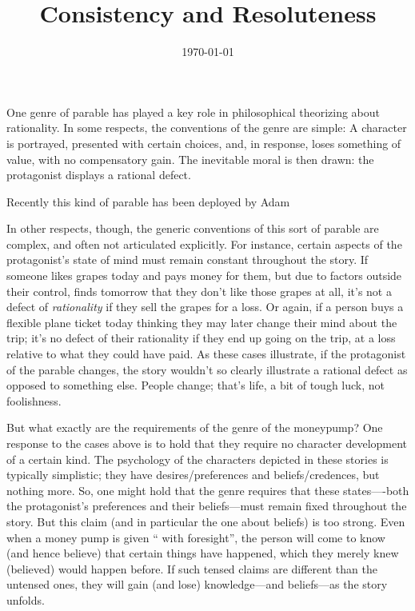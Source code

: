\documentclass[11pt]{article}
\title{Consistency and Resoluteness}
\author{}
\date{\today}
\theoremstyle{definition}
\theoremstyle{definition}
\begin{document}
\maketitle

One genre of parable has played a key role in philosophical theorizing about rationality. In some respects, the conventions of the genre are simple: A character is portrayed, presented with certain choices, and, in response, loses something of value, with no compensatory gain. The inevitable moral is then drawn: the protagonist displays a rational defect.

Recently this kind of parable has been deployed by Adam \cite{Elga2010}

In other respects, though, the generic conventions of this sort of parable are complex, and often not articulated explicitly. For instance, certain aspects of the protagonist's state of mind must remain constant throughout the story. If someone likes grapes today and pays money for them, but due to factors outside their control, finds tomorrow that they don't like those grapes at all, it's not a defect of \emph{rationality} if they sell the grapes for a loss. Or again, if a person buys a flexible plane ticket today thinking they may later change their mind about the trip; it's no defect of their rationality if they end up going on the trip, at a loss relative to what they could have paid. As these cases illustrate, if the protagonist of the parable changes, the story wouldn't so clearly illustrate a rational defect as opposed to something else. People change; that's life, a bit of tough luck, not foolishness.

But what exactly are the requirements of the genre of the moneypump? One response to the cases above is to hold that they require no character development of a certain kind. The psychology of the characters depicted in these stories is typically simplistic; they have desires/preferences and beliefs/credences, but nothing more. So, one might hold that the genre requires that these states----both the protagonist's preferences and their beliefs---must remain fixed throughout the story. But this claim (and in particular the one about beliefs) is too strong. Even when a money pump is given `` with foresight'', the person will come to know (and hence believe) that certain things have happened, which they merely knew (believed) would happen before. If such tensed claims are different than the untensed ones, they will gain (and lose) knowledge---and beliefs---as the story unfolds. 
\end{document}
